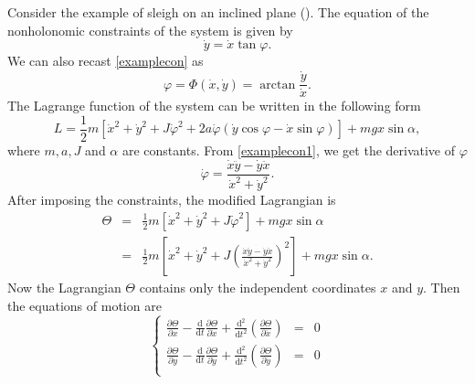\documentclass[preprint,11pt]{elsarticle}
\newcommand{\mathd}{\mathrm{d}}
\begin{document}
Consider the example of sleigh on an inclined plane (\cite{Neimark}). The equation of the nonholonomic constraints of the system is given by
\begin{equation}
  \dot{y} = \dot{x} \tan \varphi . \label{examplecon}
\end{equation}
We can also recast \eqref{examplecon} as
\begin{equation}
  \varphi = \Phi ( \dot{x}, \dot{y}) =  \arctan \frac{\dot{y}}{\dot{x}}.
  \label{examplecon1}
\end{equation}
The Lagrange function of the system can be written in the following form
\begin{equation}
  L = \frac{1}{2} m \left[ \dot{x}^2 + \dot{y}^2  + J \dot{\varphi}^2 + 2 a
  \dot{\varphi} ( \dot{y} \cos \varphi - \dot{x} \sin \varphi)\right] + m g x \sin\alpha,
\end{equation}
where $m, a, J$ and $\alpha$ are constants.
From \eqref{examplecon1}, we get the derivative of $\varphi$
\begin{equation}
  \dot{\varphi}=\frac{\dot{x} \ddot{y}-\dot{y} \ddot{x}}{\dot{x}^2+\dot{y}^2}.
\end{equation}
After imposing the constraints, the modified Lagrangian is
\begin{equation}\label{examplelagrangian}
\begin{array}{rcl}
  \Theta&=&\frac{1}{2} m \left[ \dot{x}^2 + \dot{y}^2  + J \dot{\varphi}^2\right]+ m g x \sin\alpha\\[6pt]
        &=&\frac{1}{2} m \left[ \dot{x}^2 + \dot{y}^2  + J \left( \frac{\dot{x} \ddot{y}-\dot{y} \ddot{x}}{\dot{x}^2+\dot{y}^2}\right)^2\right]+ m g x \sin\alpha.
\end{array}
\end{equation}
Now the Lagrangian $\Theta$ contains only the independent coordinates $x$ and $y$.
Then the equations of motion are
\begin{equation}\label{exampleeuler}
\left\{\begin{array}{rcl}
    \frac{\partial \Theta}{\partial x} - \frac{\mathd}{\mathd t}
  \frac{\partial \Theta}{\partial \dot{x}} +
  \frac{\mathd^2}{\mathd t^2} \left( \frac{\partial \Theta}{\partial
  \ddot{x}} \right)&=&0\\[6pt]
  \frac{\partial \Theta}{\partial y} - \frac{\mathd}{\mathd t}
  \frac{\partial \Theta}{\partial \dot{y}} +
  \frac{\mathd^2}{\mathd t^2} \left( \frac{\partial \Theta}{\partial
  \ddot{y}} \right)&=&0\\
  \end{array}\right.
\end{equation}
\end{document}

